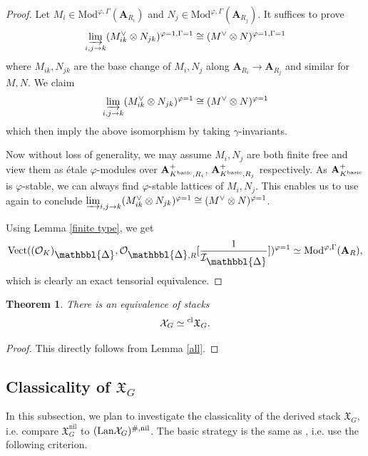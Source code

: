 \documentclass[10pt]{article}
\newtheorem{thm}{Theorem}[section]
\numberwithin{equation}{section}
\newcommand{\frakX}{{\mathfrak X}}
\newcommand{\calI}{{\mathcal I}}
\newcommand{\calO}{{\mathcal O}}
\newcommand{\calX}{{\mathcal X}}
\newcommand{\Lan}{{\mathrm{Lan}}}
\newcommand{\Mod}{{\mathrm{Mod}}}           %
\newcommand{\nil}{\mathrm{nil}}
\newcommand{\Vect}{{\mathrm{Vect}}}         %
\newcommand{\bfA}{{\textbf{A}}}
\newcommand{\Prism}{{\mathlarger{\mathbbl{\Delta}}}} %
\begin{document}
\begin{proof}
    Let $M_i\in \Mod^{\varphi,\Gamma}(\bfA_{R_i})$ and $N_j\in \Mod^{\varphi,\Gamma}(\bfA_{R_j})$. It suffices to prove
    \[
    \varinjlim_{i,j\to k}(M_{ik}^{\vee}\otimes N_{jk})^{\varphi=1,\Gamma=1}\cong (M^\vee\otimes N)^{\varphi=1,\Gamma=1}
    \]
    where $M_{ik},N_{jk}$ are the base change of $M_i,N_j$ along $\bfA_{R_i}\to \bfA_{R_j}$ and similar for $M,N$. We claim 
    \[
    \varinjlim_{i,j\to k}(M_{ik}^{\vee}\otimes N_{jk})^{\varphi=1}\cong (M^\vee\otimes N)^{\varphi=1}
    \]
    which then imply the above isomorphism by taking $\gamma$-invariants.

    Now without loss of generality, we may assume $M_i,N_j$ are both finite free and view them as \'etale $\varphi$-modules over $\bfA^+_{K^{\rm basic},R_i}$, $\bfA^+_{K^{\rm basic},R_j}$ respectively. As $\bfA^+_{K^{\rm basic}}$ is $\varphi$-stable, we can always find $\varphi$-stable lattices of $M_i, N_j$. This enables us to use \cite[Lemma 2.24]{Min23} again to conclude $\varinjlim_{i,j\to k}(M_{ik}^{\vee}\otimes N_{jk})^{\varphi=1}\cong (M^\vee\otimes N)^{\varphi=1}$.

    Using Lemma \ref{finite type}, we get
    \[
    \Vect((\calO_K)_{\Prism},\calO_{\Prism,R}[\frac{1}{\calI_{\Prism}}])^{\varphi=1}\simeq \Mod^{\varphi,\Gamma}(\bfA_{R}),
    \]
    which is clearly an exact tensorial equivalence.


\end{proof}

\begin{thm}\label{classical}
    There is an equivalence of stacks
    \[
    \calX_G\simeq {^{\rm cl}\frakX_G}.
    \]
\end{thm}
\begin{proof}
    This directly follows from Lemma \ref{all}.
\end{proof}






\subsection{Classicality of $\frakX_G$}
In this subsection, we plan to investigate the classicality of the derived stack $\frakX_G$, i.e. compare $\frakX_G^{\nil}$ to $(\Lan\calX_G)^{\#,\rm nil}$. The basic strategy is the same as \cite{Min23}, i.e. use the following criterion.
\end{document}
